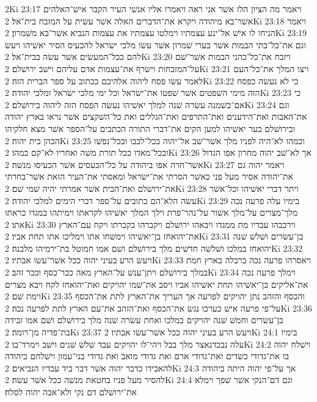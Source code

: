 2Ki 23:17  ויאמר מה הציון הלז אשׁר אני ראה ויאמרו אליו אנשׁי העיר הקבר אישׁ־האלהים אשׁר־בא מיהודה ויקרא את־הדברים האלה אשׁר עשׂית על המזבח בית־אל׃
2Ki 23:18  ויאמר הניחו לו אישׁ אל־ינע עצמתיו וימלטו עצמתיו את עצמות הנביא אשׁר־בא משׁמרון׃
2Ki 23:19  וגם את־כל־בתי הבמות אשׁר בערי שׁמרון אשׁר עשׂו מלכי ישׂראל להכעיס הסיר יאשׁיהו ויעשׂ להם ככל־המעשׂים אשׁר עשׂה בבית־אל׃
2Ki 23:20  ויזבח את־כל־כהני הבמות אשׁר־שׁם על־המזבחות וישׂרף את־עצמות אדם עליהם וישׁב ירושׁלם׃
2Ki 23:21  ויצו המלך את־כל־העם לאמר עשׂו פסח ליהוה אלהיכם ככתוב על ספר הברית הזה׃
2Ki 23:22  כי לא נעשׂה כפסח הזה מימי השׁפטים אשׁר שׁפטו את־ישׂראל וכל ימי מלכי ישׂראל ומלכי יהודה׃
2Ki 23:23  כי אם־בשׁמנה עשׂרה שׁנה למלך יאשׁיהו נעשׂה הפסח הזה ליהוה בירושׁלם׃
2Ki 23:24  וגם את־האבות ואת־הידענים ואת־התרפים ואת־הגללים ואת כל־השׁקצים אשׁר נראו בארץ יהודה ובירושׁלם בער יאשׁיהו למען הקים את־דברי התורה הכתבים על־הספר אשׁר מצא חלקיהו הכהן בית יהוה׃
2Ki 23:25  וכמהו לא־היה לפניו מלך אשׁר־שׁב אל־יהוה בכל־לבבו ובכל־נפשׁו ובכל־מאדו ככל תורת משׁה ואחריו לא־קם כמהו׃
2Ki 23:26  אך לא־שׁב יהוה מחרון אפו הגדול אשׁר־חרה אפו ביהודה על כל־הכעסים אשׁר הכעיסו מנשׁה׃
2Ki 23:27  ויאמר יהוה גם את־יהודה אסיר מעל פני כאשׁר הסרתי את־ישׂראל ומאסתי את־העיר הזאת אשׁר־בחרתי את־ירושׁלם ואת־הבית אשׁר אמרתי יהיה שׁמי שׁם׃
2Ki 23:28  ויתר דברי יאשׁיהו וכל־אשׁר עשׂה הלא־הם כתובים על־ספר דברי הימים למלכי יהודה׃
2Ki 23:29  בימיו עלה פרעה נכה מלך־מצרים על־מלך אשׁור על־נהר־פרת וילך המלך יאשׁיהו לקראתו וימיתהו במגדו כראתו אתו׃
2Ki 23:30  וירכבהו עבדיו מת ממגדו ויבאהו ירושׁלם ויקברהו בקברתו ויקח עם־הארץ את־יהואחז בן־יאשׁיהו וימשׁחו אתו וימליכו אתו תחת אביו׃
2Ki 23:31  בן־עשׂרים ושׁלשׁ שׁנה יהואחז במלכו ושׁלשׁה חדשׁים מלך בירושׁלם ושׁם אמו חמוטל בת־ירמיהו מלבנה׃
2Ki 23:32  ויעשׂ הרע בעיני יהוה ככל אשׁר־עשׂו אבתיו׃
2Ki 23:33  ויאסרהו פרעה נכה ברבלה בארץ חמת במלך בירושׁלם ויתן־ענשׁ על־הארץ מאה ככר־כסף וככר זהב׃
2Ki 23:34  וימלך פרעה נכה את־אליקים בן־יאשׁיהו תחת יאשׁיהו אביו ויסב את־שׁמו יהויקים ואת־יהואחז לקח ויבא מצרים וימת שׁם׃
2Ki 23:35  והכסף והזהב נתן יהויקים לפרעה אך העריך את־הארץ לתת את־הכסף על־פי פרעה אישׁ כערכו נגשׂ את־הכסף ואת־הזהב את־עם הארץ לתת לפרעה נכה׃
2Ki 23:36  בן־עשׂרים וחמשׁ שׁנה יהויקים במלכו ואחת עשׂרה שׁנה מלך בירושׁלם ושׁם אמו זבידה בת־פדיה מן־רומה׃
2Ki 23:37  ויעשׂ הרע בעיני יהוה ככל אשׁר־עשׂו אבתיו׃
2Ki 24:1  בימיו עלה נבכדנאצר מלך בבל ויהי־לו יהויקים עבד שׁלשׁ שׁנים וישׁב וימרד־בו׃
2Ki 24:2  וישׁלח יהוה בו את־גדודי כשׂדים ואת־גדודי ארם ואת גדודי מואב ואת גדודי בני־עמון וישׁלחם ביהודה להאבידו כדבר יהוה אשׁר דבר ביד עבדיו הנביאים׃
2Ki 24:3  אך על־פי יהוה היתה ביהודה להסיר מעל פניו בחטאת מנשׁה ככל אשׁר עשׂה׃
2Ki 24:4  וגם דם־הנקי אשׁר שׁפך וימלא את־ירושׁלם דם נקי ולא־אבה יהוה לסלח׃
